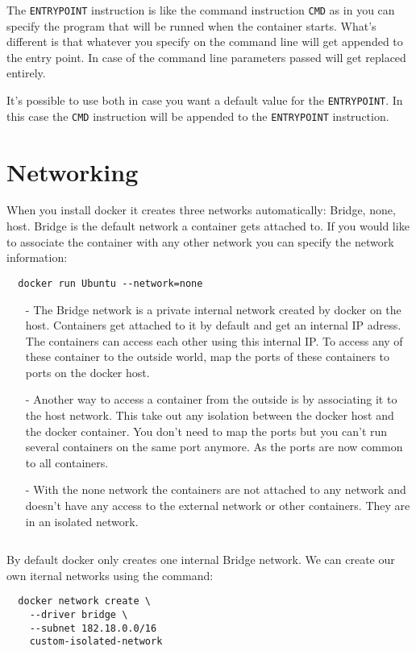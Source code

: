 \documentclass[french]{article}
\begin{document}
The \verb|ENTRYPOINT| instruction is like the command instruction \verb|CMD| as in you can specify the program that will be runned when the container starts. What's different is that whatever you specify on the command line will get appended to the entry point. In case of the command line parameters passed will get replaced entirely.

It's possible to use both in case you want a default value for the \verb|ENTRYPOINT|. In this case the \verb|CMD| instruction will be appended to the \verb|ENTRYPOINT| instruction.

\section{Networking}

When you install docker it creates three networks automatically: Bridge, none, host. Bridge is the default network a container gets attached to. If you would like to associate the container with any other network you can specify the network information:
\begin{verbatim}
  docker run Ubuntu --network=none
\end{verbatim}
\begin{itemize}
  \item [-] The Bridge network is a private internal network created by docker on the host. Containers get attached to it by default and get an internal IP adress. The containers can access each other using this internal IP. To access any of these container to the outside world, map the ports of these containers to ports on the docker host.
  \item [-] Another way to access a container from the outside is by associating it to the host network. This take out any isolation between the docker host and the docker container. You don't need to map the ports but you can't run several containers on the same port anymore. As the ports are now common to all containers.
  \item [-] With the none network the containers are not attached to any network and doesn't have any access to the external network or other containers. They are in an isolated network.
\end{itemize}$ $

By default docker only creates one internal Bridge network. We can create our own iternal networks using the command:
\begin{verbatim}
  docker network create \
    --driver bridge \
    --subnet 182.18.0.0/16
    custom-isolated-network
\end{verbatim}
\end{document}
